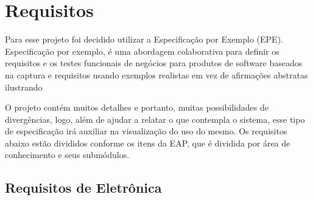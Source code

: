 \chapter[Requisitos]{Requisitos}
	Para esse projeto foi decidido utilizar a Especificação por Exemplo (EPE). Especificação por exemplo, é uma 
	abordagem colaborativa para definir os requisitos e os testes funcionais de negócios para produtos de software 
	baseados na captura e requisitos usando exemplos realistas em vez de afirmações abstratas ilustrando \cite{bdd} 

	O projeto contém muitos detalhes e portanto, muitas possibilidades de divergências, logo, além de ajudar a relatar 
	o que contempla o sistema, esse tipo de especificação irá auxiliar na visualização do uso do mesmo. Os requisitos 
	abaixo estão divididos conforme os itens da EAP, que é dividida por área de conhecimento e seus submódulos.

	\section[Requisitos de Eletrônica]{Requisitos de Eletrônica}

